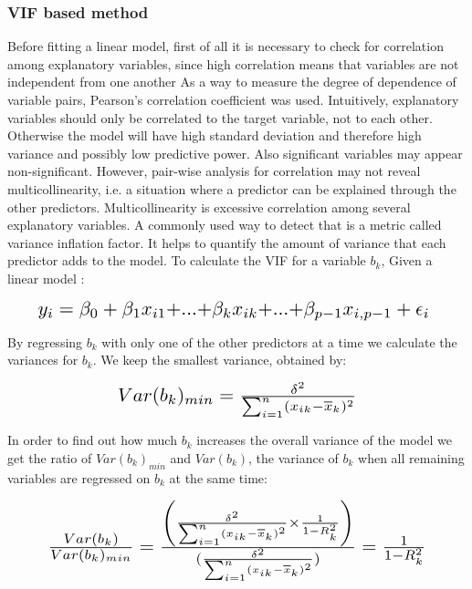 \documentclass[11pt]{article}
\begin{document}
\subsubsection{VIF based method}

Before fitting a linear model, first of all it is necessary to check for correlation among explanatory variables, since high correlation means that variables are not independent from one another As a way to measure the degree of dependence of variable pairs, Pearson’s correlation coefficient was used.
Intuitively, explanatory variables should only be correlated to the target variable, not to each other. Otherwise the model will have high standard deviation and therefore high variance and possibly low predictive power. Also significant variables may appear non-significant.
However, pair-wise analysis for correlation may not reveal multicollinearity, i.e. a situation where a predictor can be explained through the other predictors. Multicollinearity is excessive correlation among several explanatory variables. A commonly used way to detect that is a metric called variance inflation factor. It helps to quantify the amount of variance that each predictor adds to the model.
To calculate the VIF for a variable $b_{k}$,
Given a linear model :  
 \begin{center} \[ \scalebox{1.5} {$y_{i} = \beta_{0}+\beta_{1}x_{i1}+$...$+\beta_{k}x_{ik}+$...$+\beta_{p-1}x_{i,p-1}+\epsilon_{i} $ }\] \end{center}

By regressing $b_{k}$ with only one of the other predictors at a time we calculate the variances for $ b_{k}$.
We keep the smallest variance, obtained by: 
\begin{center} \[ \scalebox{1.5} {$Var(b_{k})_{min} = \frac{\delta^2 }{\sum_{i=1}^{n}(x_{ik} - \overline{x}_{k})^2}$}\]  \end{center}

In order to find out how much $b_{k}$ increases the overall variance of the model we get the ratio of $Var(b_{k})_{min}$ and $Var(b_{k})$, the variance of $b_{k}$ when all remaining variables are regressed on $b_{k}$ at the same time:

\begin{center}  \[ \scalebox{1.5} {$\frac{Var(b_{k})}{Var(b_{k})_{min}}=\frac{\left ( \frac{\delta^2 }{\sum_{i=1}^{n}(x_{ik} - \overline{x}_{k})^2} \times \frac{1}{1-R^2_{k}} \right )}{(\frac{\delta^2 }{\sum_{i=1}^{n}(x_{ik} - \overline{x}_{k})^2})}=\frac{1}{1-R^2_{k}}$}\] \end{center}
\end{document}
